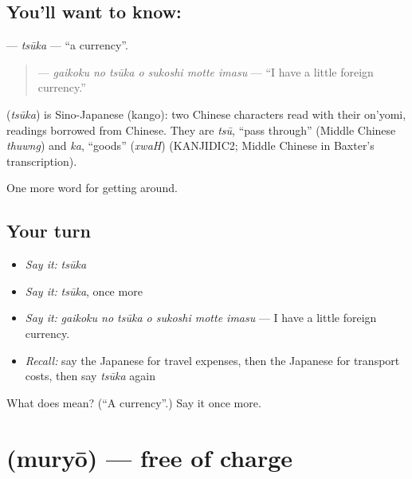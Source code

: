\subsection*{You'll want to know: }
\textbf{} — \emph{tsūka} — \textquotedblleft{}a currency\textquotedblright{}.

\begin{quote}
\textbf{   } — \emph{gaikoku no tsūka o sukoshi motte imasu} — \textquotedblleft{}I have a little foreign currency.\textquotedblright{}
\end{quote}

\begin{cousinweb}
\textbf{} (\emph{tsūka}) is Sino-Japanese (kango): two Chinese characters read with their on'yomi, readings borrowed from Chinese. They are \emph{tsū}, \textquotedblleft{}pass through\textquotedblright{} (Middle Chinese \emph{thuwng}) and \emph{ka}, \textquotedblleft{}goods\textquotedblright{} (\emph{xwaH}) (KANJIDIC2; Middle Chinese in Baxter's transcription).
\end{cousinweb}

\begin{grammarlens}[title={What you've built}]
One more word for getting around.
\end{grammarlens}

\subsection*{Your turn}
\begin{itemize}
\raggedright
  \item \emph{Say it:} \emph{tsūka}
  \item \emph{Say it:} \emph{tsūka}, once more
  \item \emph{Say it:} \emph{gaikoku no tsūka o sukoshi motte imasu} — I have a little foreign currency.
  \item \emph{Recall:} say the Japanese for travel expenses, then the Japanese for transport costs, then say \emph{tsūka} again
\end{itemize}

\begin{tcolorbox}[breakable,colback=teal!4,colframe=teal!35!black,title={Before you move on}]
What does  mean? (\textquotedblleft{}A currency\textquotedblright{}.) Say it once more.
\end{tcolorbox}
\section[\texorpdfstring{\ja{むりょう} (muryō)}{むりょう (muryō)}]{ (muryō) — free of charge}

